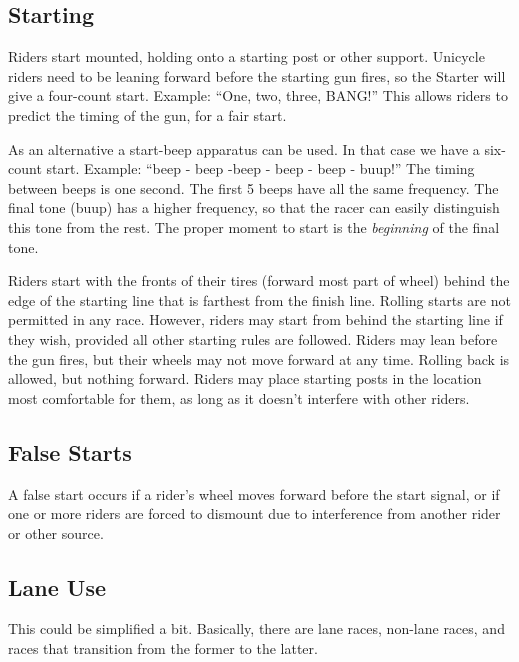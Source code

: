 \subsection{Starting}

Riders start mounted, holding onto a starting post or other support.
Unicycle riders need to be leaning forward before the starting gun fires, so the Starter will give a four-count start.
Example: ``One, two, three, BANG!''
This allows riders to predict the timing of the gun, for a fair start.

As an alternative a start-beep apparatus can be used.
In that case we have a six-count start.
Example: ``beep - beep -beep - beep - beep - buup!''
The timing between beeps is one second.
The first 5 beeps have all the same frequency.
The final tone (buup) has a higher frequency, so that the racer can easily distinguish this tone from the rest.
The proper moment to start is the \textit{beginning} of the final tone.

Riders start with the fronts of their tires (forward most part of wheel) behind the edge of the starting line that is farthest from the finish line.
Rolling starts are not permitted in any race.
However, riders may start from behind the starting line if they wish, provided all other starting rules are followed.
Riders may lean before the gun fires, but their wheels may not move forward at any time.
Rolling back is allowed, but nothing forward.
Riders may place starting posts in the location most comfortable for them, as long as it doesn't interfere with other riders.

\subsection{False Starts}

A false start occurs if a rider's wheel moves forward before the start signal, or if one or more riders are forced to dismount due to interference from another rider or other source.

\subsection{Lane Use}

\begin{comment2016}
This could be simplified a bit.
Basically, there are lane races, non-lane races, and races that transition from the former to the latter.
\end{comment2016}

